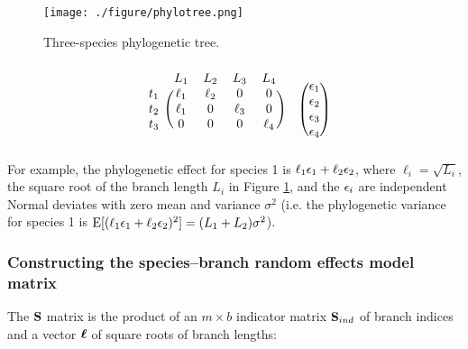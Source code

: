\documentclass[12pt]{article}
\begin{document}
\begin{center}
\begin{figure}[H]
  \texttt{[image: ./figure/phylotree.png]}
  \caption{Three-species phylogenetic tree.}
\label{fig:tree}
\end{figure}
\end{center}
\[
  \begin{blockarray}{ccccc}
  & L_1 & L_2 & L_3 & L_4  \\
  \begin{block}{c(cccc)}
  t_1 & \ell_1 & \ell_2 & 0           & 0 \\
  t_2 & \ell_1 &  0          & \ell_3 & 0 \\
  t_3 & 0           &  0          & 0           & \ell_4 \\
  \end{block}
  \end{blockarray}
  \hspace{0.5cm}
  \begin{blockarray}{c}
    \vphantom{L_1} \\
    \begin{block}{(c)}
      \e_1 \\
      \e_2 \\
      \e_3 \\
      \e_4 \\
    \end{block}
  \end{blockarray}
  \]
For example, the phylogenetic effect for species 1 is $\ell_1 { \epsilon}_1 + \ell_2 { \epsilon}_2$, where $\ell_i = \sqrt{L_i}$, the square root of the branch length $L_i$ in Figure \ref{fig:tree}, and the ${ \epsilon}_i$ are independent Normal deviates with zero mean and variance $\sigma^2$ (i.e. the phylogenetic variance for species 1 is $\textrm{E}[(\ell_1 { \epsilon}_1 + \ell_2 { \epsilon}_2)^2] = (L_1 + L_2)\sigma^2$).

\subsubsection*{Constructing the species--branch random effects model matrix}

The ${\mathbf S}$ matrix is the product of an $m \times b$ indicator matrix ${\mathbf S}_{ind}$ of branch indices and a vector ${\boldsymbol \ell}$ of square roots of branch lengths:
\end{document}
